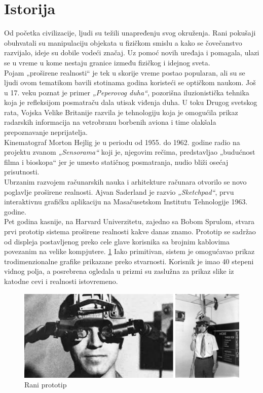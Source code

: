 \documentclass[a4paper]{article}
\begin{document}
	\section{Istorija}
    \label{sec:Istorija}
    Od početka civilizacije, ljudi su težili unapređenju svog okruženja. Rani pokušaji obuhvatali su manipulaciju objekata u fizičkom smislu a kako se čovečanstvo razvijalo,
	 ideje su dobile vodeći značaj.\cite{Istorija 1} Uz pomoć novih uređaja i pomagala, ulazi se u vreme u kome nestaju granice između fizičkog i idejnog sveta.\\
    Pojam „proširene realnosti“ je tek u skorije vreme postao popularan, ali su se ljudi ovom tematikom bavili stotinama godina koristeći se optičkom naukom. Još u 17. veku poznat
	 je primer \emph{„Peperovog duha“}, pozorišna iluzionistička tehnika koja je refleksijom posmatraču dala utisak viđenja duha. U toku Drugog svetskog rata, Vojska Velike Britanije razvila 
	 je tehnologiju koja je omogućila prikaz radarskih informacija na vetrobranu borbenih aviona i time olakšala prepoznavanje neprijatelja.\\
    Kinematograf Morton Hejlig je u periodu od 1955. do 1962. godine radio na projektu zvanom \emph{„Sensorama“} koji je, njegovim rečima, predstavljao „budućnost filma i bioskopa“ jer je 
	umesto statičnog posmatranja, nudio bliži osećaj prisutnosti.\\
    Ubrzanim razvojem računarskih nauka i arhitekture računara otvorilo se novo poglavlje proširene realnosti. Ajvan Saderland je razvio \emph{„Sketchpad“}, prvu interaktivnu grafičku aplikaciju
	 na Masačusetskom Institutu Tehnologije 1963. godine.\\
    Pet godina kasnije, na Harvard Univerzitetu, zajedno sa Bobom Sprulom, stvara prvi prototip sistema proširene realnosti kakve danas znamo. 
	Prototip se sadržao od displeja postavljenog preko cele glave korisnika sa brojnim kablovima povezanim na velike kompjutere. \ref{fig:Rani prototip} Iako primitivan, sistem je omogućavao prikaz
	 trodimenzionalne grafike prikazane preko stvarnosti. Korisnik je imao 40 stepeni vidnog polja, a posrebrena ogledala u prizmi su zaslužna za prikaz slike iz katodne cevi i realnosti istovremeno.\\
    \begin{figure}
	\begin{center}
		\includegraphics[scale=0.5]{raniprototip_harvard.png}
		\end{center}
		\caption{Rani prototip}
		\label{fig:Rani prototip}
	\end{figure}
\end{document}
